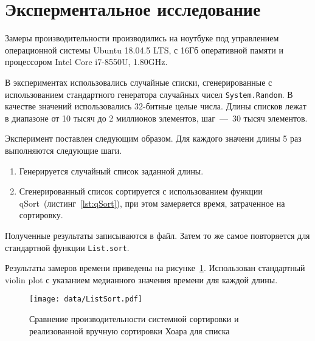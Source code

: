 \section{Эксперментальное исследование}

Замеры производительности производились на ноутбуке под управлением операционной системы Ubuntu 18.04.5 LTS, с 16Гб оперативной памяти и процессором Intel Core i7-8550U, 1.80GHz.  

В экспериментах использовались случайные списки, сгенерированные с использованием стандартного генератора случайных чисел \verb|System.Random|.
В качестве значений использовались 32-битные целые числа.
Длины списков лежат в диапазоне от 10 тысяч до 2 миллионов элементов, шаг~---~30 тысяч элементов.

Эксперимент поставлен следующим образом. 
Для каждого значени длины 5 раз выполняются следующие шаги.
\begin{enumerate}
  \item Генерируется случайный список заданной длины.
  \item Сгенерированный список сортируется с использованием функции qSort~(листинг~\ref{lst:qSort}), при этом замеряется время, затраченное на сортировку. 
\end{enumerate}

Полученные результаты записываются в файл.
Затем то же самое повторяется для стандартной функции \verb|List.sort|.

Результаты замеров времени приведены на рисунке~\ref{fig:list_sort}.
Использован стандартный violin plot с указанием медианного значения времени для каждой длины.

\begin{figure}
	\begin{center}
	   \texttt{[image: data/ListSort.pdf]}
	   \caption{Сравнение производительности системной сортировки и реализованной вручную сортировки Хоара для списка}
	   \label{fig:list_sort}
	\end{center}	
\end{figure}
